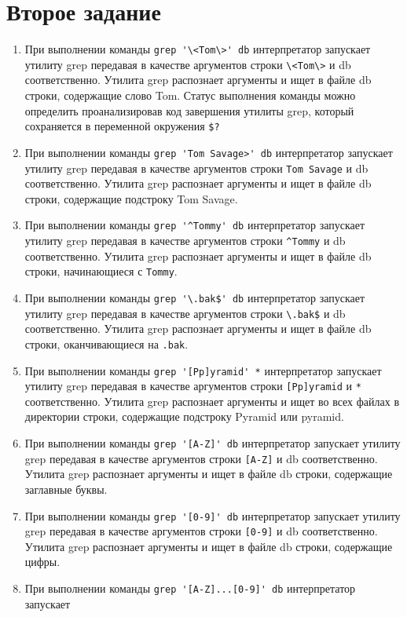\documentclass[12pt, a4paper]{article}
\begin{document}
\section{Второе задание}
\begin{enumerate}
  \item При выполнении команды \verb|grep '\<Tom\>' db| интерпретатор запускает
    утилиту grep передавая в качестве аргументов строки \verb|\<Tom\>| и db
    соответственно. Утилита grep распознает аргументы и ищет в файле db строки,
    содержащие слово Tom. Статус выполнения команды можно определить
    проанализировав код завершения утилиты grep, который сохраняется в
    переменной окружения \verb|$?| 
  \item При выполнении команды \verb|grep 'Tom Savage>' db| интерпретатор запускает
    утилиту grep передавая в качестве аргументов строки \verb|Tom Savage| и db
    соответственно. Утилита grep распознает аргументы и ищет в файле db строки,
    содержащие подстроку Tom Savage.
  \item При выполнении команды \verb|grep '^Tommy' db| интерпретатор запускает
    утилиту grep передавая в качестве аргументов строки \verb|^Tommy| и db
    соответственно. Утилита grep распознает аргументы и ищет в файле db строки,
    начинающиеся с \verb|Tommy|. 
  \item При выполнении команды \verb|grep '\.bak$' db| интерпретатор запускает
    утилиту grep передавая в качестве аргументов строки \verb|\.bak$| и db
    соответственно. Утилита grep распознает аргументы и ищет в файле db строки,
    оканчивающиеся на \verb|.bak|.
  \item При выполнении команды \verb|grep '[Pp]yramid' *| интерпретатор запускает
    утилиту grep передавая в качестве аргументов строки \verb|[Pp]yramid| и \verb|*|
    соответственно. Утилита grep распознает аргументы и ищет во всех файлах в директории строки,
    содержащие подстроку Pyramid или pyramid. 
  \item При выполнении команды \verb|grep '[A-Z]' db| интерпретатор запускает
    утилиту grep передавая в качестве аргументов строки \verb|[A-Z]| и db
    соответственно. Утилита grep распознает аргументы и ищет в файле db строки,
    содержащие заглавные буквы.
  \item При выполнении команды \verb|grep '[0-9]' db| интерпретатор запускает
    утилиту grep передавая в качестве аргументов строки \verb|[0-9]| и db
    соответственно. Утилита grep распознает аргументы и ищет в файле db строки,
    содержащие цифры.
  \item При выполнении команды \verb|grep '[A-Z]...[0-9]' db| интерпретатор запускает

\end{enumerate}
\end{document}
